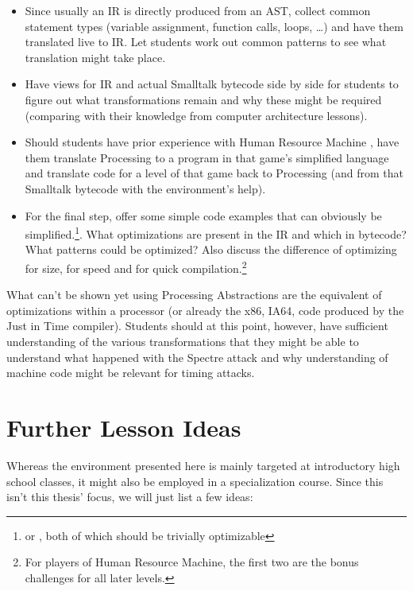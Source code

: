 \begin{instructions}
\begin{itemize}
\item Since usually an \ac{IR} is directly produced from an \ac{AST}, collect common statement types (variable assignment, function calls, loops, \dots) and have them translated live to \ac{IR}. Let students work out common patterns to see what translation might take place.
\item Have views for \ac{IR} and actual Smalltalk bytecode side by side for students to figure out what transformations remain and why these might be required (comparing with their knowledge from computer architecture lessons).
\item Should students have prior experience with Human Resource Machine \cite{Tom15}, have them translate Processing to a program in that game's simplified language and translate code for a level of that game back to Processing (and from that Smalltalk bytecode with the environment's help).
\item For the final step, offer some simple code examples that can obviously be simplified.\footnote{\eg {} or , both of which should be trivially optimizable}. What optimizations are present in the \ac{IR} and which in bytecode? What patterns could be optimized? Also discuss the difference of optimizing for size, for speed and for quick compilation.\footnote{For players of Human Resource Machine, the first two are the bonus challenges for all later levels.}
\end{itemize}
\item What can't be shown yet using Processing Abstractions are the equivalent of optimizations within a processor (or already the x86, IA64, \etc code produced by the Just in Time compiler). Students should at this point, however, have sufficient understanding of the various transformations that they might be able to understand what happened \eg with the Spectre attack \cite{Koc19} and why understanding of machine code might be relevant for timing attacks.
\end{instructions}



\section{Further Lesson Ideas} \label{sc_lesson_other}

Whereas the environment presented here is mainly targeted at introductory high school classes, it might also be employed in a specialization course. Since this isn't this thesis' focus, we will just list a few ideas:

